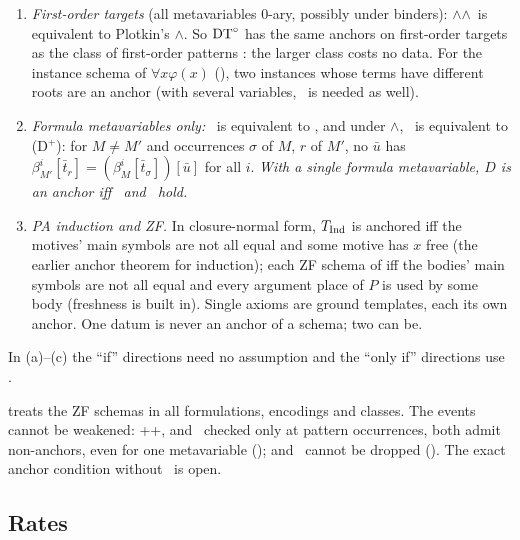 \begin{corollary}[Specializations]\label{cor:single:special}
\leavevmode
\begin{enumerate}[label=(\alph*)]
\item \emph{First-order targets} (all metavariables $0$-ary, possibly under binders): \evRs$\wedge$\evN$\wedge$\evU\ is equivalent to Plotkin's \evR$\wedge$\evD. So $\mathrm{DT}^{\circ}$ has the same anchors on first-order targets as the class of first-order patterns \citep{plotkin1970note,reynolds1970transformational}: the larger class costs no data. For the instance schema of $\forall x\varphi(x)$ (), two instances whose terms have different roots are an anchor (with several variables, \evD\ is needed as well).
\item \emph{Formula metavariables only:} \evRs\ is equivalent to \evR, and under \evR$\wedge$\evN, \evU\ is equivalent to (D$^+$): for $M\neq M'$ and occurrences $\sigma$ of $M$, $r$ of $M'$, no $\bar u$ has $\beta^i_{M'}[\bar t_r]=(\beta^i_M[\bar t_\sigma])[\bar u]$ for all $i$. \emph{With a single formula metavariable, $D$ is an anchor iff \evR\ and \evN\ hold.}
\item \emph{PA induction and ZF.} In closure-normal form, $T_{\mathrm{Ind}}$ is anchored iff the motives' main symbols are not all equal and some motive has $x$ free (the earlier anchor theorem for induction); each ZF schema of  iff the bodies' main symbols are not all equal and every argument place of $P$ is used by some body (freshness is built in). Single axioms are ground templates, each its own anchor. One datum is never an anchor of a schema; two can be.
\end{enumerate}
In (a)--(c) the ``if'' directions need no assumption and the ``only if'' directions use \Rich.
\end{corollary}

\noindent {} treats the ZF schemas in all formulations, encodings and classes. The events cannot be weakened: \evR+\evN+\evD, and \evU\ checked only at pattern occurrences, both admit non-anchors, even for one metavariable (); and \Rich\ cannot be dropped (). The exact anchor condition without \Rich\ is open.

\subsection{Rates}\label{sec:single:rates}

